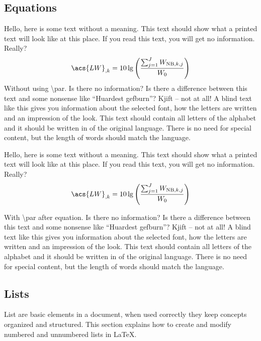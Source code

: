 \subsection{Equations}
%
Hello, here is some text without a meaning. This text should show what
a printed text will look like at this place. If you read this text, you will
get no information. Really?
%
\begin{equation}
\acs{LW}_{,k}=10\lg\left( \frac{\sum_{j=1}^J W_{\mathrm{NB},k,j}}{W_{0}}\right) 
\label{L_W,k}
\end{equation}
%
Without using \textbackslash par. Is there no information? Is there a difference
between this text and some nonsense like “Huardest gefburn”? Kjift –
not at all! A blind text like this gives you information about the selected
font, how the letters are written and an impression of the look. This text
should contain all letters of the alphabet and it should be written in of the
original language. There is no need for special content, but the length of
words should match the language.
\par
Hello, here is some text without a meaning. This text should show what
a printed text will look like at this place. If you read this text, you will
get no information. Really?
%
\begin{equation}
\acs{LW}_{,k}=10\lg\left( \frac{\sum_{j=1}^J W_{\mathrm{NB},k,j}}{W_{0}}\right) 
\label{L_Wa,k}
\end{equation}
%
\par
With \textbackslash par after equation. Is there no information? Is there a difference
between this text and some nonsense like “Huardest gefburn”? Kjift –
not at all! A blind text like this gives you information about the selected
font, how the letters are written and an impression of the look. This text
should contain all letters of the alphabet and it should be written in of the
original language. There is no need for special content, but the length of
words should match the language.
%
%
%
 \subsection{Lists} 			%
 List are basic elements in a document, when used correctly they keep concepts organized and structured. This section explains how to create and modify numbered and unnumbered lists in \LaTeX. 
